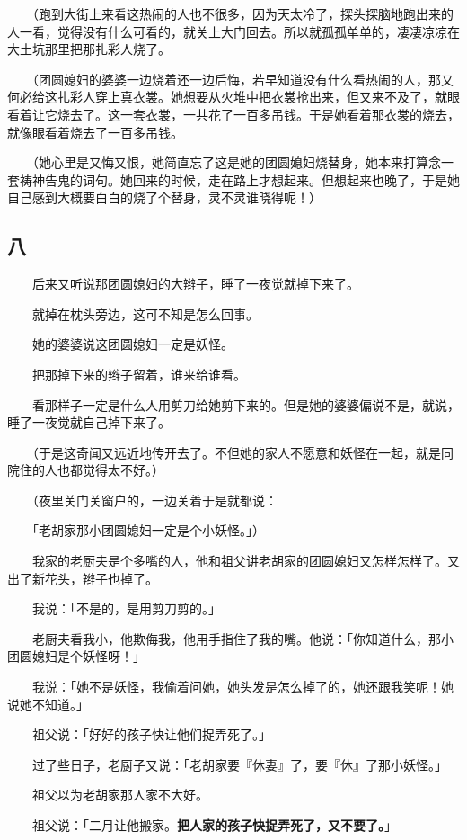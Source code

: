 \documentclass[UTF8]{ctexart}
\begin{document}
　　（跑到大街上来看这热闹的人也不很多，因为天太冷了，探头探脑地跑出来的人一看，觉得没有什么可看的，就关上大门回去。所以就孤孤单单的，凄凄凉凉在大土坑那里把那扎彩人烧了。

　　（团圆媳妇的婆婆一边烧着还一边后悔，若早知道没有什么看热闹的人，那又何必给这扎彩人穿上真衣裳。她想要从火堆中把衣裳抢出来，但又来不及了，就眼看着让它烧去了。这一套衣裳，一共花了一百多吊钱。于是她看着那衣裳的烧去，就像眼看着烧去了一百多吊钱。

　　（她心里是又悔又恨，她简直忘了这是她的团圆媳妇烧替身，她本来打算念一套祷神告鬼的词句。她回来的时候，走在路上才想起来。但想起来也晚了，于是她自己感到大概要白白的烧了个替身，灵不灵谁晓得呢！）

\subsection{八}

　　后来又听说那团圆媳妇的大辫子，睡了一夜觉就掉下来了。

　　就掉在枕头旁边，这可不知是怎么回事。

　　她的婆婆说这团圆媳妇一定是妖怪。

　　把那掉下来的辫子留着，谁来给谁看。

　　看那样子一定是什么人用剪刀给她剪下来的。但是她的婆婆偏说不是，就说，睡了一夜觉就自己掉下来了。

　　（于是这奇闻又远近地传开去了。不但她的家人不愿意和妖怪在一起，就是同院住的人也都觉得太不好。）

　　（夜里关门关窗户的，一边关着于是就都说：

　　「老胡家那小团圆媳妇一定是个小妖怪。」）

　　我家的老厨夫是个多嘴的人，他和祖父讲老胡家的团圆媳妇又怎样怎样了。又出了新花头，辫子也掉了。

　　我说：「不是的，是用剪刀剪的。」

　　老厨夫看我小，他欺侮我，他用手指住了我的嘴。他说：「你知道什么，那小团圆媳妇是个妖怪呀！」

　　我说：「她不是妖怪，我偷着问她，她头发是怎么掉了的，她还跟我笑呢！她说她不知道。」

　　祖父说：「好好的孩子快让他们捉弄死了。」

　　过了些日子，老厨子又说：「老胡家要『休妻』了，要『休』了那小妖怪。」

　　祖父以为老胡家那人家不大好。

　　祖父说：「二月让他搬家。\textbf{把人家的孩子快捉弄死了，又不要了。}」
\end{document}
